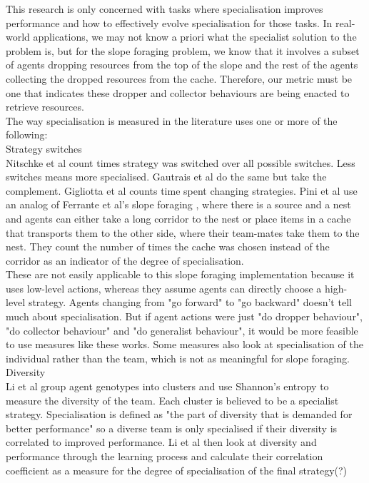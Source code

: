 \documentclass[12pt]{article}
\begin{document}
This research is only concerned with tasks where specialisation improves performance and how to effectively evolve specialisation for those tasks.
In real-world applications, we may not know a priori what the specialist solution to the problem is, but for the slope foraging problem, we know that it involves a subset of agents dropping resources from the top of the slope and the rest of the agents collecting the dropped resources from the cache.
Therefore, our metric must be one that indicates these dropper and collector behaviours are being enacted to retrieve resources.\\

The way specialisation is measured in the literature uses one or more of the following:\\

Strategy switches\\

Nitschke et al \cite{nitschke:SEC:2012} count times strategy was switched over all possible switches. Less switches means more specialised.
Gautrais et al \cite{gautrais:JTB:2002} do the same but take the complement.
Gigliotta  et al \cite{gigliotta:Neurocomputing:2018} counts time spent changing strategies.
Pini et al \cite{pini:SI:2011, pini:ICSI:2012} use an analog of Ferrante et al's slope foraging \cite{ferrante:PLoSCB:2015}, where there is a source and a nest and agents can either take a long corridor to the nest or place items in a cache that transports them to the other side, where their team-mates take them to the nest.
They count the number of times the cache was chosen instead of the corridor as an indicator of the degree of specialisation.\\

These are not easily applicable to this slope foraging implementation because it uses low-level actions, whereas they assume agents can directly choose a high-level strategy. 
Agents changing from "go forward" to "go backward" doesn't tell much about specialisation. But if agent actions were just "do dropper behaviour", "do collector behaviour" and "do generalist behaviour", it would be more feasible to use measures like these works. Some measures also look at specialisation of the individual rather than the team, which is not as meaningful for slope foraging.\\

Diversity\\

Li et al \cite{li:AB:2004} group agent genotypes into clusters and use Shannon's entropy to measure the diversity of the team. Each cluster is believed to be a specialist strategy. Specialisation is defined as "the part of diversity that is demanded for better performance" so a diverse team is only specialised if their diversity is correlated to improved performance. Li et al  then look at diversity and performance through the learning process and calculate their correlation coefficient as a measure for the degree of specialisation of the final strategy(?)\\
\end{document}
